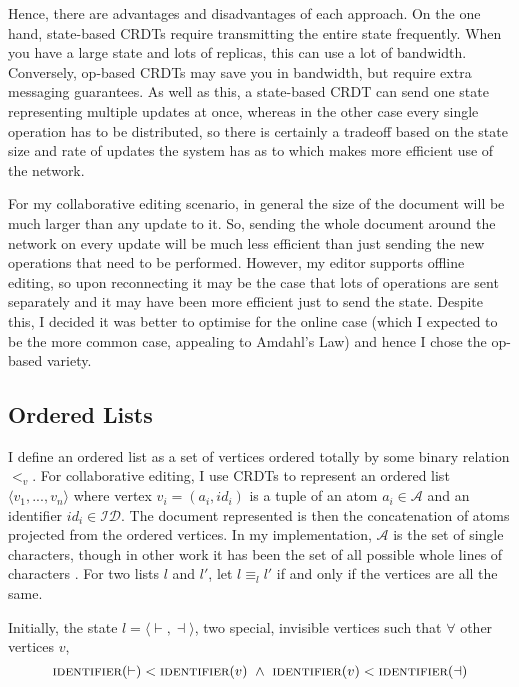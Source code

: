 \documentclass[diss.tex]{subfiles}
\begin{document}
Hence, there are advantages and disadvantages of each approach. On the one hand, state-based CRDTs require transmitting the entire state frequently. When you have a large state and lots of replicas, this can use a lot of bandwidth. Conversely, op-based CRDTs may save you in bandwidth, but require extra messaging guarantees. As well as this, a state-based CRDT can send one state representing multiple updates at once, whereas in the other case every single operation has to be distributed, so there is certainly a tradeoff based on the state size and rate of updates the system has as to which makes more efficient use of the network.

For my collaborative editing scenario, in general the size of the document will be much larger than any update to it. So, sending the whole document around the network on every update will be much less efficient than just sending the new operations that need to be performed. However, my editor supports offline editing, so upon reconnecting it may be the case that lots of operations are sent separately and it may have been more efficient just to send the state. Despite this, I decided it was better to optimise for the online case (which I expected to be the more common case, appealing to Amdahl's Law) and hence I chose the op-based variety.

\subsection{Ordered Lists}
 
I define an ordered list as a set of vertices ordered totally by some binary relation $<_v$. For collaborative editing, I use CRDTs to represent an ordered list $\langle v_1, ..., v_n\rangle$ where vertex $v_i = (a_i, id_i)$ is a tuple of an atom $a_i \in \mathcal{A}$ and an identifier $id_i \in \mathcal{ID}$. The document represented is then the concatenation of atoms projected from the ordered vertices. In my implementation, $\mathcal{A}$ is the set of single characters, though in other work it has been the set of all possible whole lines of characters \cite{logoot}. For two lists $l$ and $l'$, let $l \equiv_l l'$ if and only if the vertices are all the same.

Initially, the state $l = \langle \vdash, \dashv\rangle$, two special, invisible vertices such that $\forall $ other vertices $v$,  $$\textsc{identifier}(\vdash) < \textsc{identifier}(v) ~\wedge~ \textsc{identifier}(v) <\textsc{identifier}(\dashv)$$
\end{document}
